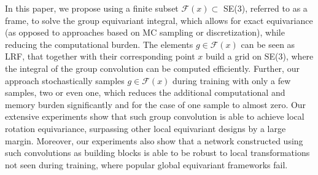 In this paper, we propose using a finite subset $\mathcal{F}(x) \subset$ SE(3), referred to as a frame, to solve the group equivariant integral, which allows for exact equivariance (as opposed to approaches based on \ac{MC} sampling or discretization), while reducing the computational burden. 
The elements $g \in \mathcal{F}(x)$ can be seen as \ac{LRF}, that together with their corresponding point $x$ build a grid on SE(3), where the integral of the group convolution can be computed efficiently.
Further, our approach stochastically samples $g \in \mathcal{F}(x)$ during training with only a few samples, two or even one, which reduces the additional computational and memory burden significantly and for the case of one sample to almost zero.
Our extensive experiments show that such group convolution is able to achieve local rotation equivariance, surpassing other local equivariant designs by a large margin.
Moreover, our experiments also show that a network constructed using such convolutions as building blocks is able to be robust to local transformations not seen during training, where popular global equivariant frameworks fail.
